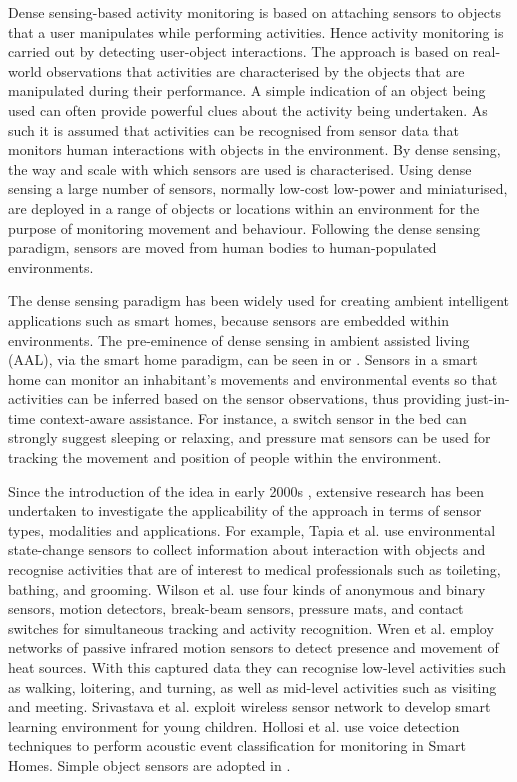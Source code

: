 Dense sensing-based activity monitoring is based on attaching sensors to objects that a user manipulates while performing activities. Hence activity monitoring is carried out by detecting user-object interactions. The approach is based on real-world observations that activities are characterised by the objects that are manipulated during their performance. A simple indication of an object being used can often provide powerful clues about the activity being undertaken. As such it is assumed that activities can be recognised from sensor data that monitors human interactions with objects in the environment. By dense sensing, the way and scale with which sensors are used is characterised. Using dense sensing a large number of sensors, normally low-cost low-power and miniaturised, are deployed in a range of objects or locations within an environment for the purpose of monitoring movement and behaviour. Following the dense sensing paradigm, sensors are moved from human bodies to human-populated environments.

The dense sensing paradigm has been widely used for creating ambient intelligent applications such as smart homes, because sensors are embedded within environments. The pre-eminence of dense sensing in ambient assisted living (AAL), via the smart home paradigm, can be seen in \cite{Chan2008} \cite{Nugent2009} or \cite{Helal2005}. Sensors in a smart home can monitor an inhabitant’s movements and environmental events so that activities can be inferred based on the sensor observations, thus providing just-in-time context-aware assistance. For instance, a switch sensor in the bed can strongly suggest sleeping or relaxing, and pressure mat sensors can be used for tracking the movement and position of people within the environment.

Since the introduction of the idea in early 2000s \cite{Bao2004} \cite{Patterson2003}, extensive research has been undertaken to investigate the applicability of the approach in terms of sensor types, modalities and applications. For example, Tapia et al. \cite{Tapia2004} use environmental state-change sensors to collect information about interaction with objects and recognise activities that are of interest to medical professionals such as toileting, bathing, and grooming. Wilson et al. \cite{Wilson2005} use four kinds of anonymous and binary sensors, motion detectors, break-beam sensors, pressure mats, and contact switches for simultaneous tracking and activity recognition. Wren et al. \cite{Wren2006} employ networks of passive infrared motion sensors to detect presence and movement of heat sources. With this captured data they can recognise low-level activities such as walking, loitering, and turning, as well as mid-level activities such as visiting and meeting. Srivastava et al. \cite{Srivastava2001} exploit wireless sensor network to develop smart learning environment for young children. Hollosi et al. \cite{Hollosi2010} use voice detection techniques to perform acoustic event classification for monitoring in Smart Homes. Simple object sensors are adopted in \cite{Aipperspach2006}.

